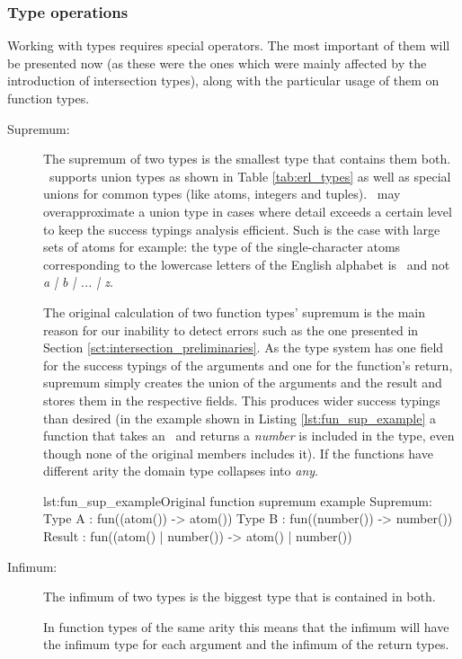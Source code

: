 \subsubsection{Type operations}
\label{sct:orig_type_operations}

Working with types requires special operators. The most important of
them will be presented now (as these were the ones which were mainly
affected by the introduction of intersection types), along with the
particular usage of them on function types.
\begin{description}
\item[Supremum:] The supremum of two types is the smallest type that
  contains them both. \er\ supports union types as shown in Table
  \ref{tab:erl_types} as well as special unions for common types (like
  atoms, integers and tuples). \dr\ may overapproximate a union type
  in cases where detail exceeds a certain level to keep the success
  typings analysis efficient. Such is the case with large sets of
  atoms for example: the type of the single-character atoms
  corresponding to the lowercase letters of the English alphabet is
  \atom\ and not \emph{a | b | ... | z}.

  The original calculation of two function types' supremum is the main
  reason for our inability to detect errors such as the one presented
  in Section \ref{sct:intersection_preliminaries}. As the type system
  has one field for the success typings of the arguments and one for
  the function's return, supremum simply creates the union of the
  arguments and the result and stores them in the respective
  fields. This produces wider success typings than desired (in the
  example shown in Listing \ref{lst:fun_sup_example} a function that
  takes an \atom\ and returns a \emph{number} is included in the type,
  even though none of the original members includes it). If the
  functions have different arity the domain type collapses into
  \emph{any}.

\begin{console}{lst:fun_sup_example}{Original function supremum example}
Supremum:
Type A : fun((atom())   -> atom())
Type B : fun((number()) -> number())
Result : fun((atom() | number()) -> atom() | number())
\end{console}

\item[Infimum:] The infimum of two types is the biggest type that is
  contained in both.

  In function types of the same arity this means that the infimum will
  have the infimum type for each argument and the infimum of the
  return types.


\end{description}
